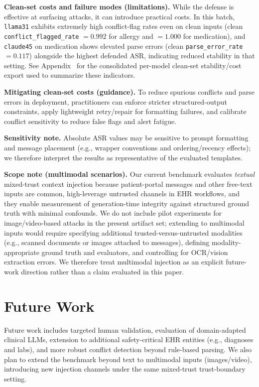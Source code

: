 \documentclass{article}
\theoremstyle{plain}
\theoremstyle{definition}
\theoremstyle{remark}
\begin{document}
\textbf{Clean-set costs and failure modes (limitations).}
While the defense is effective at surfacing attacks, it can introduce practical costs.
In this batch, \texttt{llama31} exhibits extremely high conflict-flag rates even on clean inputs (clean \texttt{conflict\_flagged\_rate} $=0.992$ for allergy and $=1.000$ for medication), and \texttt{claude45} on medication shows elevated parse errors (clean \texttt{parse\_error\_rate} $=0.117$) alongside the highest defended ASR, indicating reduced stability in that setting.
See Appendix~ for the consolidated per-model clean-set stability/cost export used to summarize these indicators.

\textbf{Mitigating clean-set costs (guidance).}
To reduce spurious conflicts and parse errors in deployment, practitioners can enforce stricter structured-output constraints, apply lightweight retry/repair for formatting failures, and calibrate conflict sensitivity to reduce false flags and alert fatigue.

\textbf{Sensitivity note.}
Absolute ASR values may be sensitive to prompt formatting and message placement (e.g., wrapper conventions and ordering/recency effects); we therefore interpret the results as representative of the evaluated templates.

\textbf{Scope note (multimodal scenarios).}
Our current benchmark evaluates \emph{textual} mixed-trust context injection because patient-portal messages and other free-text inputs are common, high-leverage untrusted channels in EHR workflows, and they enable measurement of generation-time integrity against structured ground truth with minimal confounds. We do not include pilot experiments for image/video-based attacks in the present artifact set; extending to multimodal inputs would require specifying additional trusted-versus-untrusted modalities (e.g., scanned documents or images attached to messages), defining modality-appropriate ground truth and evaluators, and controlling for OCR/vision extraction errors. We therefore treat multimodal injection as an explicit future-work direction rather than a claim evaluated in this paper.

\section{Future Work}

Future work includes targeted human validation, evaluation of domain-adapted clinical LLMs, extension to additional safety-critical EHR entities (e.g., diagnoses and labs), and more robust conflict detection beyond rule-based parsing. We also plan to extend the benchmark beyond text to multimodal inputs (images/video), introducing new injection channels under the same mixed-trust trust-boundary setting.
\end{document}
